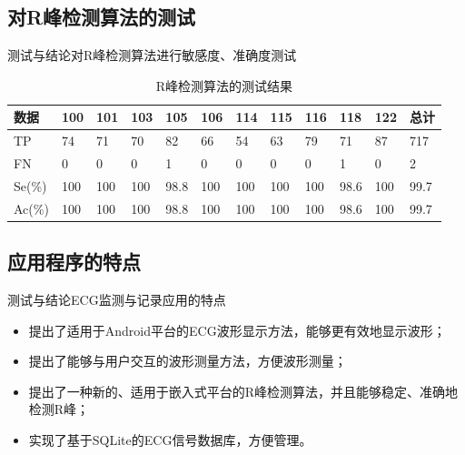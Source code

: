 \documentclass[aspectratio=43,fleqn]{beamer}
\newcommand{\liuhao}{\fontsize{6.5pt}{\baselineskip}\selectfont}  %
\begin{document}
\subsection{对R峰检测算法的测试}
\begin{frame}{测试与结论}{对R峰检测算法进行敏感度、准确度测试}
\begin{table}[htbp]
  \centering
  \caption{R峰检测算法的测试结果 %
  \label{}}
  \liuhao
\begin{tabular}{|p{0.5cm}|p{0.4cm}|p{0.4cm}|p{0.4cm}|p{0.4cm}|p{0.4cm}|p{0.4cm}|p{0.4cm}|p{0.4cm}|p{0.4cm}|p{0.4cm}|p{0.5cm}|}
\hline 
数据 & 100 & 101 & 103 & 105 & 106 & 114 & 115 & 116 & 118 & 122 & 总计 \\ 
\hline 
TP & 74 & 71 & 70 & 82 & 66 & 54 & 63 & 79 & 71 & 87 & 717 \\ 
\hline 
FN & 0 & 0 & 0 & 1 & 0 & 0 & 0 & 0 & 1 & 0 & 2 \\ 
\hline 
Se(\%) & 100 & 100 & 100 & 98.8 & 100 & 100 & 100 & 100 & 98.6 & 100 & 99.7 \\ 
\hline 
Ac(\%) & 100 & 100 & 100 & 98.8 & 100 & 100 & 100 & 100 & 98.6 & 100 & 99.7 \\ 
\hline 
\end{tabular}  
\end{table}
\end{frame}

\subsection{应用程序的特点}
\begin{frame}{测试与结论}{ECG监测与记录应用的特点}
\begin{itemize}
\item 提出了适用于Android平台的ECG波形显示方法，能够更有效地显示波形；
\item 提出了能够与用户交互的波形测量方法，方便波形测量；
\item 提出了一种新的、适用于嵌入式平台的R峰检测算法，并且能够稳定、准确地检测R峰；
\item 实现了基于SQLite的ECG信号数据库，方便管理。
\end{itemize}
\end{frame}

{\aauwavesbg
\begin{frame}
\end{frame}}
\end{document}
